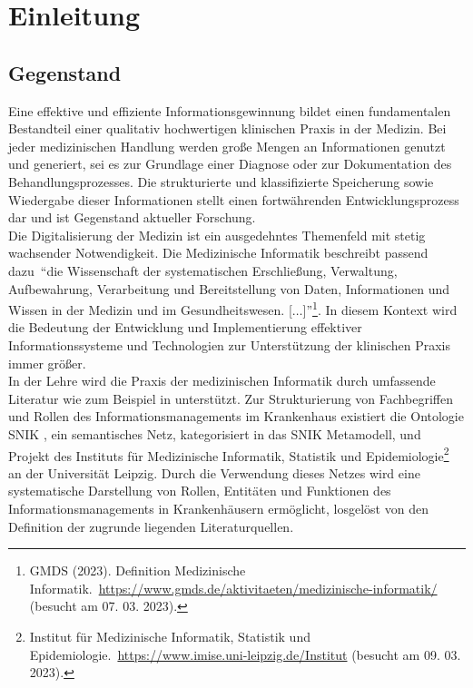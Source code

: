 \chapter{Einleitung}\label{ch:introduction}
\section{Gegenstand}\label{sec:gegenstand}
Eine effektive und effiziente Informationsgewinnung bildet einen fundamentalen Bestandteil einer qualitativ hochwertigen klinischen Praxis in der Medizin. 
Bei jeder medizinischen Handlung werden große Mengen an Informationen genutzt und generiert, sei es zur Grundlage einer Diagnose oder zur Dokumentation des Behandlungsprozesses. 
Die strukturierte und klassifizierte Speicherung sowie Wiedergabe dieser Informationen stellt einen fortwährenden Entwicklungsprozess dar und ist Gegenstand aktueller Forschung.\\

Die Digitalisierung der Medizin ist ein ausgedehntes Themenfeld mit stetig wachsender Notwendigkeit. 
Die Medizinische Informatik beschreibt passend dazu~\enquote{die Wissenschaft der systematischen Erschließung, Verwaltung, Aufbewahrung, Verarbeitung und Bereitstellung von Daten, Informationen und Wissen in der Medizin und im Gesundheitswesen. [$\dots$]}\footnote{\raggedright{}GMDS (2023). Definition Medizinische Informatik.\ \url{https://www.gmds.de/aktivitaeten/medizinische-informatik/} (besucht am 07. 03. 2023).}.
In diesem Kontext wird die Bedeutung der Entwicklung und Implementierung effektiver Informationssysteme und Technologien zur Unterstützung der klinischen Praxis immer größer.\\

In der Lehre wird die Praxis der medizinischen Informatik durch umfassende Literatur wie zum Beispiel in \citet{bb} unterstützt.
Zur Strukturierung von Fachbegriffen und Rollen des Informationsmanagements im Krankenhaus existiert die Ontologie SNIK \citep{semantischesnetz}, ein semantisches Netz, kategorisiert in das SNIK Metamodell, und Projekt des Instituts für Medizinische Informatik, Statistik und Epidemiologie\footnote{\raggedright{}Institut für Medizinische Informatik, Statistik und Epidemiologie.\ \url{https://www.imise.uni-leipzig.de/Institut} (besucht am 09. 03. 2023).} an der Universität Leipzig.
Durch die Verwendung dieses Netzes wird eine systematische Darstellung von Rollen, Entitäten und Funktionen des Informationsmanagements in Krankenhäusern ermöglicht, losgelöst von den Definition der zugrunde liegenden Literaturquellen.\\

